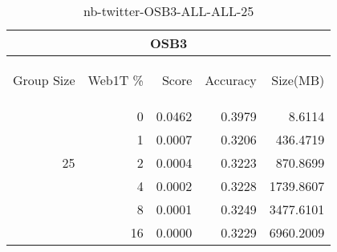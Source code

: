 \begin{center}
\begin{table}[htbp] 
 \begin{center}
\begin{tabular}{ | r | r | r | r | r |}
\hline
\multicolumn{5}{|c|}{OSB3}\\
\hline
\begin{sideways}Group Size\end{sideways} & \begin{sideways}Web1T \%\end{sideways} & \begin{sideways}Score\end{sideways} & \begin{sideways}Accuracy\end{sideways} & \begin{sideways}Size(MB)\end{sideways}\\
\hline
\multirow{5}{*}{25}
 & 0 & 0.0462 & 0.3979 & 8.6114\\ \cline{2-5}
 & 1 & 0.0007 & 0.3206 & 436.4719\\ \cline{2-5}
 & 2 & 0.0004 & 0.3223 & 870.8699\\ \cline{2-5}
 & 4 & 0.0002 & 0.3228 & 1739.8607\\ \cline{2-5}
 & 8 & 0.0001 & 0.3249 & 3477.6101\\ \cline{2-5}
 & 16 & 0.0000 & 0.3229 & 6960.2009\\ \cline{2-5}
\hline
\end{tabular}
\caption{nb-twitter-OSB3-ALL-ALL-25}
\label{table:nb-twitter-OSB3-ALL-ALL-25}
\end{center}
 \end{table}
\end{center}

